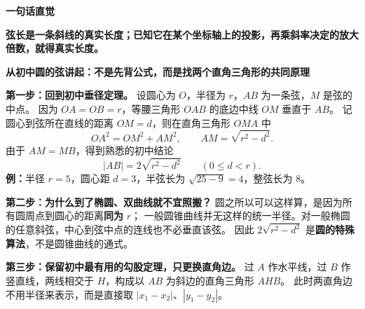 \begin{explanationbox}
\textbf{\textcolor{CExplanation}{一句话直觉}}

\textbf{弦长是一条斜线的真实长度；已知它在某个坐标轴上的投影，再乘斜率决定的放大倍数，就得真实长度。}

\medskip

\textbf{从初中圆的弦讲起：不是先背公式，而是找两个直角三角形的共同原理}

\textbf{第一步：回到初中垂径定理。}
设圆心为 $O$，半径为 $r$，$AB$ 为一条弦，$M$ 是弦的中点。
因为 $OA=OB=r$，等腰三角形 $OAB$ 的底边中线 $OM$ 垂直于 $AB$。
记圆心到弦所在直线的距离 $OM=d$，则在直角三角形 $OMA$ 中
\[
 OA^2=OM^2+AM^2,\qquad
 AM=\sqrt{r^2-d^2}.
\]
由于 $AM=MB$，得到熟悉的初中结论
\[
 \boxed{|AB|=2\sqrt{r^2-d^2}\qquad(0\le d<r).}
\]
\textbf{例：}半径 $r=5$，圆心距 $d=3$，半弦长为 $\sqrt{25-9}=4$，整弦长为 $8$。

\begin{center}
\end{center}

\textbf{第二步：为什么到了椭圆、双曲线就不宜照搬？}
圆之所以可以这样算，是因为所有圆周点到圆心的距离\textbf{同为} $r$；
一般圆锥曲线并无这样的统一半径。对一般椭圆的任意斜弦，中心到弦中点的连线也不必垂直该弦。
因此 $2\sqrt{r^2-d^2}$ 是\textbf{圆的特殊算法}，不是圆锥曲线的通式。

\textbf{第三步：保留初中最有用的勾股定理，只更换直角边。}
过 $A$ 作水平线，过 $B$ 作竖直线，两线相交于 $H$，构成以 $AB$ 为斜边的直角三角形 $AHB$。
此时两直角边不用半径来表示，而是直接取
$|x_1-x_2|$、$|y_1-y_2|$。


\end{explanationbox}

